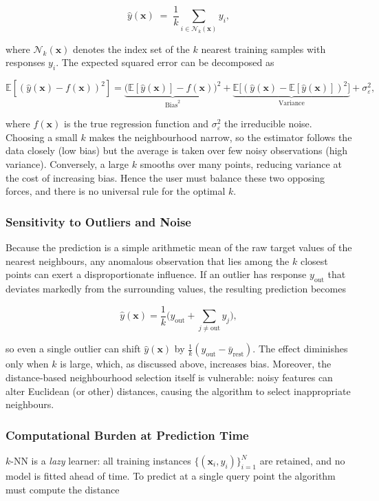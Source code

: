 \documentclass[12pt, a4paper]{article}
\begin{document}
\[
\hat{y}(\mathbf{x}) \;=\; \frac{1}{k}\sum_{i\in\mathcal{N}_k(\mathbf{x})} y_i ,
\]

where \(\mathcal{N}_k(\mathbf{x})\) denotes the index set of the \(k\) nearest training samples with responses \(y_i\).  The expected squared error can be decomposed as  

\[
\mathbb{E}\!\left[(\hat{y}(\mathbf{x})-f(\mathbf{x}))^{2}\right]
      = \underbrace{\bigl(\mathbb{E}[\hat{y}(\mathbf{x})]-f(\mathbf{x})\bigr)^{2}}_{\text{Bias}^{2}}
        + \underbrace{\mathbb{E}\!\bigl[(\hat{y}(\mathbf{x})-\mathbb{E}[\hat{y}(\mathbf{x})])^{2}\bigr]}_{\text{Variance}}
        + \sigma^{2}_{\varepsilon},
\]

where \(f(\mathbf{x})\) is the true regression function and \(\sigma^{2}_{\varepsilon}\) the irreducible noise.  Choosing a small \(k\) makes the neighbourhood narrow, so the estimator follows the data closely (low bias) but the average is taken over few noisy observations (high variance).  Conversely, a large \(k\) smooths over many points, reducing variance at the cost of increasing bias.  Hence the user must balance these two opposing forces, and there is no universal rule for the optimal \(k\).

\subsubsection{Sensitivity to Outliers and Noise}
Because the prediction is a simple arithmetic mean of the raw target values of the nearest neighbours, any anomalous observation that lies among the \(k\) closest points can exert a disproportionate influence.  If an outlier has response \(y_{\text{out}}\) that deviates markedly from the surrounding values, the resulting prediction becomes  

\[
\hat{y}(\mathbf{x}) = \frac{1}{k}\bigl( y_{\text{out}} + \sum_{j\neq \text{out}} y_j \bigr),
\]

so even a single outlier can shift \(\hat{y}(\mathbf{x})\) by \(\frac{1}{k}(y_{\text{out}}- \bar{y}_{\text{rest}})\).  The effect diminishes only when \(k\) is large, which, as discussed above, increases bias.  Moreover, the distance‑based neighbourhood selection itself is vulnerable: noisy features can alter Euclidean (or other) distances, causing the algorithm to select inappropriate neighbours.

\subsubsection{Computational Burden at Prediction Time}
\(k\)-NN is a \emph{lazy} learner: all training instances \(\{(\mathbf{x}_i,y_i)\}_{i=1}^{N}\) are retained, and no model is fitted ahead of time.  To predict at a single query point the algorithm must compute the distance  
\end{document}
